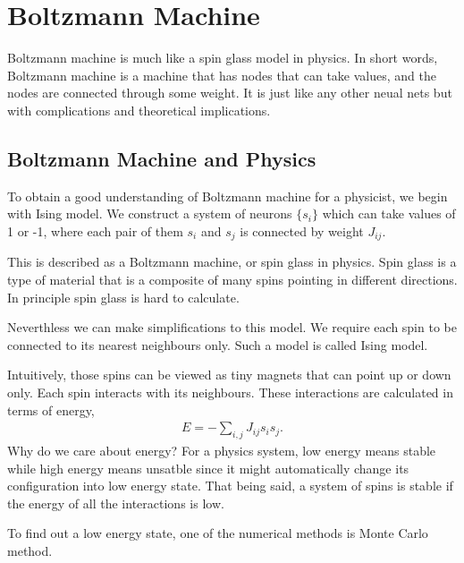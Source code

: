 \documentclass[letterpaper,10pt,english]{sphinxmanual}
\begin{document}
\section{Boltzmann Machine}
\label{\detokenize{machine-intelligence/boltzmann-machine::doc}}\label{\detokenize{machine-intelligence/boltzmann-machine:boltzmann-machine}}
Boltzmann machine is much like a spin glass model in physics. In short words, Boltzmann machine is a machine that has nodes that can take values, and the nodes are connected through some weight. It is just like any other neual nets but with complications and theoretical implications.


\subsection{Boltzmann Machine and Physics}
\label{\detokenize{machine-intelligence/boltzmann-machine:boltzmann-machine-and-physics}}
To obtain a good understanding of Boltzmann machine for a physicist, we begin with Ising model. We construct a system of neurons \(\{ s_i\}\) which can take values of 1 or -1, where each pair of them \(s_i\) and \(s_j\) is connected by weight \(J_{ij}\).

This is described as a Boltzmann machine, or spin glass in physics. Spin glass is a type of material that is a composite of many spins pointing in different directions. In principle spin glass is hard to calculate.

Neverthless we can make simplifications to this model. We require each spin to be connected to its nearest neighbours only. Such a model is called Ising model.

Intuitively, those spins can be viewed as tiny magnets that can point up or down only. Each spin interacts with its neighbours. These interactions are calculated in terms of energy,
\begin{equation*}
\begin{split}E = -\sum_{i,j} J_{ij} s_i s_j.\end{split}
\end{equation*}
Why do we care about energy? For a physics system, low energy means stable while high energy means unsatble since it might automatically change its configuration into low energy state. That being said, a system of spins is stable if the energy of all the interactions is low.

To find out a low energy state, one of the numerical methods is Monte Carlo method.
\end{document}
